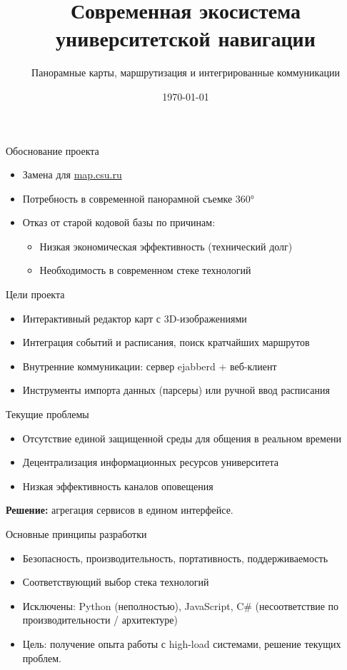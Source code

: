\documentclass[10pt, aspectratio=169]{beamer}
\title{Современная экосистема университетской навигации}
\subtitle{Панорамные карты, маршрутизация и интегрированные коммуникации}
\institute{Челябинский государственный университет}
\date{\today}
\begin{document}
\begin{frame}[plain]
	\titlepage
\end{frame}


\begin{frame}{Обоснование проекта}
	\begin{itemize}
		\item Замена для \href{https://map.csu.ru}{map.csu.ru}
		\item Потребность в современной панорамной съемке 360°
		\item Отказ от старой кодовой базы по причинам:
		      \begin{itemize}
			      \item Низкая экономическая эффективность (технический долг)
			      \item Необходимость в современном стеке технологий
		      \end{itemize}
	\end{itemize}
\end{frame}

\begin{frame}{Цели проекта}
	\begin{itemize}
		\item Интерактивный редактор карт с 3D-изображениями
		\item Интеграция событий и расписания, поиск кратчайших маршрутов
		\item Внутренние коммуникации: сервер ejabberd + веб-клиент
		\item Инструменты импорта данных (парсеры) или ручной ввод расписания
	\end{itemize}
\end{frame}


\begin{frame}{Текущие проблемы}
	\begin{itemize}
		\item Отсутствие единой защищенной среды для общения в реальном времени
		\item Децентрализация информационных ресурсов университета
		\item Низкая эффективность каналов оповещения
	\end{itemize}
	\vfill
	\textbf{Решение:} агрегация сервисов в едином интерфейсе.
\end{frame}

\begin{frame}{Основные принципы разработки}
	\begin{itemize}
		\item Безопасность, производительность, портативность, поддерживаемость
		\item Соответствующий выбор стека технологий
		\item Исключены: Python (неполностью), JavaScript, C\# (несоответствие по производительности / архитектуре)
		\item Цель: получение опыта работы с high-load системами, решение текущих проблем.
	\end{itemize}
\end{frame}
\end{document}
